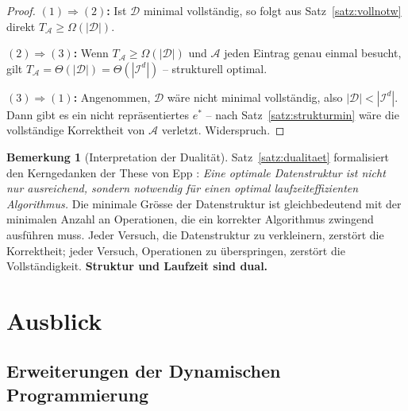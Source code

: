 ﻿\documentclass[a4paper,12pt]{article}
\theoremstyle{definition}
\newtheorem{bemerkung}{Bemerkung}
\begin{document}
\begin{proof}
    \textbf{$(1) \Rightarrow (2)$:} Ist $\mathcal{D}$ minimal vollst\"{a}ndig,
    so folgt aus Satz~\ref{satz:vollnotw} direkt
    $T_{\mathcal{A}} \geq \Omega(|\mathcal{D}|)$.

    \textbf{$(2) \Rightarrow (3)$:} Wenn $T_{\mathcal{A}} \geq \Omega(|\mathcal{D}|)$
    und $\mathcal{A}$ jeden Eintrag genau einmal besucht, gilt
    $T_{\mathcal{A}} = \Theta(|\mathcal{D}|) = \Theta(|\mathcal{I}^d|)$
    -- strukturell optimal.

    \textbf{$(3) \Rightarrow (1)$:} Angenommen, $\mathcal{D}$ w\"{a}re nicht
    minimal vollst\"{a}ndig, also $|\mathcal{D}| < |\mathcal{I}^d|$.
    Dann gibt es ein nicht repr\"{a}sentiertes $e^*$ -- nach
    Satz~\ref{satz:strukturmin} w\"{a}re die vollst\"{a}ndige Korrektheit
    von $\mathcal{A}$ verletzt. Widerspruch. \qedhere
\end{proof}

\begin{bemerkung}[Interpretation der Dualit\"{a}t]
    Satz~\ref{satz:dualitaet} formalisiert den Kerngedanken der These von Epp
    \cite{epp2026struktur}:
    \emph{Eine optimale Datenstruktur ist nicht nur ausreichend, sondern
    notwendig f\"{u}r einen optimal laufzeiteffizienten Algorithmus.}
    Die minimale Gr\"{o}sse der Datenstruktur ist gleichbedeutend mit der
    minimalen Anzahl an Operationen, die ein korrekter Algorithmus zwingend
    ausf\"{u}hren muss. Jeder Versuch, die Datenstruktur zu verkleinern,
    zerst\"{o}rt die Korrektheit; jeder Versuch, Operationen zu \"{u}berspringen,
    zerst\"{o}rt die Vollst\"{a}ndigkeit.
    \textbf{Struktur und Laufzeit sind dual.}
\end{bemerkung}

\section{Ausblick}

\subsection{Erweiterungen der Dynamischen Programmierung}
\end{document}
